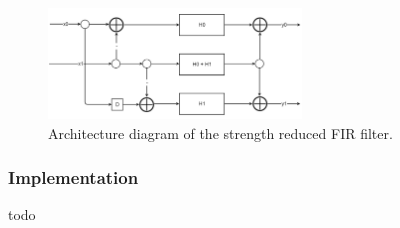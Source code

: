 \begin{figure}
\begin{center}
\includegraphics[width=0.6\textwidth]{images/architecture_sr.png}
\caption{Architecture diagram of the strength reduced FIR filter.}
\label{fig:architecture_sr}
\end{center}
\end{figure}
\subsubsection{Implementation}
todo


